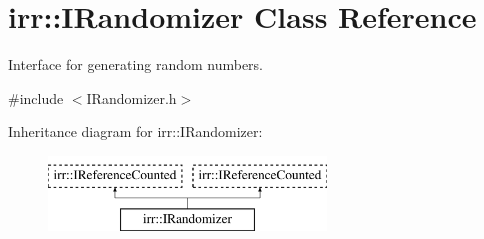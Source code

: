 \hypertarget{classirr_1_1IRandomizer}{}\section{irr\+:\+:I\+Randomizer Class Reference}
\label{classirr_1_1IRandomizer}


Interface for generating random numbers.  




{\ttfamily \#include $<$I\+Randomizer.\+h$>$}

Inheritance diagram for irr\+:\+:I\+Randomizer\+:\begin{figure}[H]
\begin{center}
\leavevmode
\includegraphics[height=2.000000cm]{classirr_1_1IRandomizer}
\end{center}
\end{figure}
